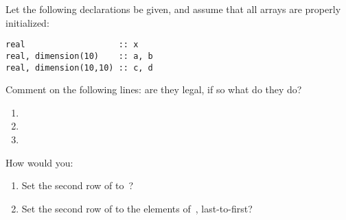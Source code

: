\begin{exercise}
  \label{ex:farray-assign-section}
  Let the following declarations be given, and assume that all arrays
  are properly initialized:
\begin{lstlisting}
real                   :: x
real, dimension(10)    :: a, b
real, dimension(10,10) :: c, d
\end{lstlisting}

Comment on the following lines: are they legal, if so what do they do?
\begin{enumerate}
\item {}
\item {}
\item {}
\end{enumerate}

How would you:
\begin{enumerate}
\item Set the second row of  to~?
\item Set the second row of  to the elements of~, last-to-first?
\end{enumerate}
\end{exercise}
